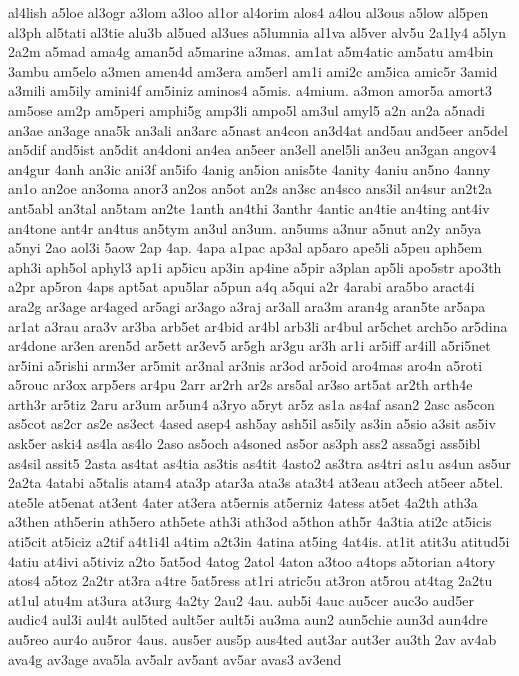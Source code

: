 {al4lish
a5loe
al3ogr
a3lom
a3loo
al1or
al4orim
alos4
a4lou
al3ous
a5low
al5pen
al3ph
al5tati
al3tie
alu3b
al5ued
al3ues
a5lumnia
al1va
al5ver
alv5u
2a1ly4
a5lyn
2a2m
a5mad
ama4g
aman5d
a5marine
a3mas.
am1at
a5m4atic
am5atu
am4bin
3ambu
am5elo
a3men
amen4d
am3era
am5erl
am1i
ami2c
am5ica
amic5r
3amid
a3mili
am5ily
amini4f
am5iniz
aminos4
a5mis.
a4mium.
a3mon
amor5a
amort3
am5ose
am2p
am5peri
amphi5g
amp3li
ampo5l
am3ul
amyl5
a2n
an2a
a5nadi
an3ae
an3age
ana5k
an3ali
an3arc
a5nast
an4con
an3d4at
and5au
and5eer
an5del
an5dif
and5ist
an5dit
an4doni
an4ea
an5eer
an3ell
anel5li
an3eu
an3gan
angov4
an4gur
4anh
an3ic
ani3f
an5ifo
4anig
an5ion
anis5te
4anity
4aniu
an5no
4anny
an1o
an2oe
an3oma
anor3
an2os
an5ot
an2s
an3sc
an4sco
ans3il
an4sur
an2t2a
ant5abl
an3tal
an5tam
an2te
1anth
an4thi
3anthr
4antic
an4tie
an4ting
ant4iv
an4tone
ant4r
an4tus
an5tym
an3ul
an3um.
an5ums
a3nur
a5nut
an2y
an5ya
a5nyi
2ao
aol3i
5aow
2ap
4ap.
4apa
a1pac
ap3al
ap5aro
ape5li
a5peu
aph5em
aph3i
aph5ol
aphyl3
ap1i
ap5icu
ap3in
ap4ine
a5pir
a3plan
ap5li
apo5str
apo3th
a2pr
ap5ron
4aps
apt5at
apu5lar
a5pun
a4q
a5qui
a2r
4arabi
ara5bo
aract4i
ara2g
ar3age
ar4aged
ar5agi
ar3ago
a3raj
ar3all
ara3m
aran4g
aran5te
ar5apa
ar1at
a3rau
ara3v
ar3ba
arb5et
ar4bid
ar4bl
arb3li
ar4bul
ar5chet
arch5o
ar5dina
ar4done
ar3en
aren5d
ar5ett
ar3ev5
ar5gh
ar3gu
ar3h
ar1i
ar5iff
ar4ill
a5ri5net
ar5ini
a5rishi
arm3er
ar5mit
ar3nal
ar3nis
ar3od
ar5oid
aro4mas
aro4n
a5roti
a5rouc
ar3ox
arp5ers
ar4pu
2arr
ar2rh
ar2s
ars5al
ar3so
art5at
ar2th
arth4e
arth3r
ar5tiz
2aru
ar3um
ar5un4
a3ryo
a5ryt
ar5z
as1a
as4af
asan2
2asc
as5con
as5cot
as2cr
as2e
as3ect
4ased
asep4
ash5ay
ash5il
as5ily
as3in
a5sio
a3sit
as5iv
ask5er
aski4
as4la
as4lo
2aso
as5och
a4soned
as5or
as3ph
ass2
assa5gi
ass5ibl
as4sil
assit5
2asta
as4tat
as4tia
as3tis
as4tit
4asto2
as3tra
as4tri
as1u
as4un
as5ur
2a2ta
4atabi
a5talis
atam4
ata3p
atar3a
ata3s
ata3t4
at3eau
at3ech
at5eer
a5tel.
ate5le
at5enat
at3ent
4ater
at3era
at5ernis
at5erniz
4atess
at5et
4a2th
ath3a
a3then
ath5erin
ath5ero
ath5ete
ath3i
ath3od
a5thon
ath5r
4a3tia
ati2c
at5icis
ati5cit
at5iciz
a2tif
a4t1i4l
a4tim
a2t3in
4atina
at5ing
4at4is.
at1it
atit3u
atitud5i
4atiu
at4ivi
a5tiviz
a2to
5at5od
4atog
2atol
4aton
a3too
a4tops
a5torian
a4tory
atos4
a5toz
2a2tr
at3ra
a4tre
5at5ress
at1ri
atric5u
at3ron
at5rou
at4tag
2a2tu
at1ul
atu4m
at3ura
at3urg
4a2ty
2au2
4au.
aub5i
4auc
au5cer
auc3o
aud5er
audic4
aul3i
aul4t
aul5ted
ault5er
ault5i
au3ma
aun2
aun5chie
aun3d
aun4dre
au5reo
aur4o
au5ror
4aus.
aus5er
aus5p
aus4ted
aut3ar
aut3er
au3th
2av
av4ab
ava4g
av3age
ava5la
av5alr
av5ant
av5ar
avas3
av3end
}
